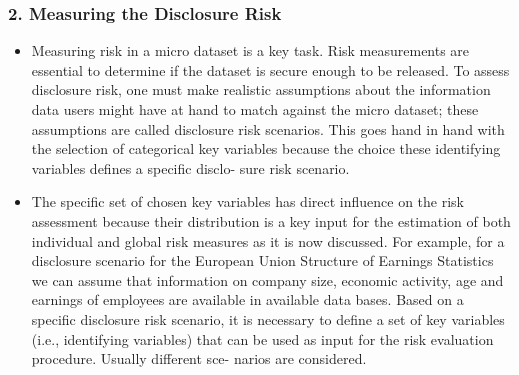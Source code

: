 \documentclass[]{article}
\title{}
\author{}
\begin{document}
	





\subsubsection{2. Measuring the Disclosure Risk}
\begin{itemize}
%	
	\item Measuring risk in a micro dataset is a key task. Risk measurements are essential
	to determine if the dataset is secure enough to be released. To assess disclosure
	risk, one must make realistic assumptions about the information data users might
	have at hand to match against the micro dataset; these assumptions are called
	disclosure risk scenarios. This goes hand in hand with the selection of categorical
	key variables because the choice these identifying variables deﬁnes a speciﬁc disclo-
	sure risk scenario. 
	
	\item The speciﬁc set of chosen key variables has direct influence on
	the risk assessment because their distribution is a key input for the estimation of
	both individual and global risk measures as it is now discussed. For example, for a
	disclosure scenario for the European Union Structure of Earnings Statistics we can
	assume that information on company size, economic activity, age and earnings of
	employees are available in available data bases. Based on a speciﬁc disclosure risk
	scenario, it is necessary to deﬁne a set of key variables (i.e., identifying variables)
	that can be used as input for the risk evaluation procedure. Usually different sce-
	narios are considered. 
	

\end{itemize}
\end{document}
